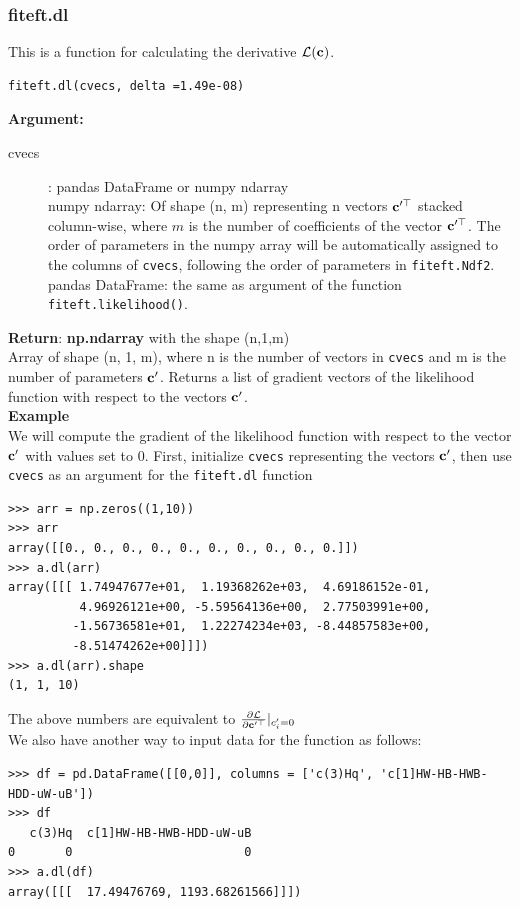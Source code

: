 \documentclass[12pt]{article}
\def\b#1{\boldsymbol{\rm #1}}
\begin{document}
\subsubsection{fiteft.dl}
This is a function for calculating the derivative $\mathcal{L}(\b c)$.
\begin{verbatim}
fiteft.dl(cvecs, delta =1.49e-08)
\end{verbatim}
\textbf{Argument:}
\begin{description}
  \item[cvecs]: pandas DataFrame or numpy ndarray\\
  numpy ndarray: Of shape (n, m) representing n vectors $\b c'^\top$ stacked column-wise, where $m$ is the number of coefficients of the vector $\b c'^\top$. The order of parameters in the numpy array will be automatically assigned to the columns of \verb|cvecs|, following the order of parameters in  \verb|fiteft.Ndf2|.\\
  pandas DataFrame: the same as argument of the function \verb|fiteft.likelihood()|.
 \end{description}
 \textbf{Return}: \textbf{np.ndarray} with the shape (n,1,m)\\
 \indent Array of shape (n, 1, m), where n is the number of vectors in \verb|cvecs| and m is the number of parameters $\b c'$. Returns a list of gradient vectors of the likelihood function with respect to the vectors $\b c'$.
 \\[1cm]
 \textbf{Example}\\
 We will compute the gradient of the likelihood function with respect to the vector $\b c'$ with values set to 0. First, initialize \verb|cvecs| representing the vectors $\b c'$, then use \verb|cvecs| as an argument for the \verb|fiteft.dl| function
\begin{verbatim}
>>> arr = np.zeros((1,10))
>>> arr
array([[0., 0., 0., 0., 0., 0., 0., 0., 0., 0.]])
>>> a.dl(arr)
array([[[ 1.74947677e+01,  1.19368262e+03,  4.69186152e-01,
          4.96926121e+00, -5.59564136e+00,  2.77503991e+00,
         -1.56736581e+01,  1.22274234e+03, -8.44857583e+00,
         -8.51474262e+00]]])
>>> a.dl(arr).shape
(1, 1, 10)
\end{verbatim}
The above numbers are equivalent to $\frac{\partial \mathcal{L}}{\partial \b c'^\top}|_{c'_i=0} $\\
We also have another way to input data for the function as follows:
\begin{verbatim}
>>> df = pd.DataFrame([[0,0]], columns = ['c(3)Hq', 'c[1]HW-HB-HWB-HDD-uW-uB'])
>>> df
   c(3)Hq  c[1]HW-HB-HWB-HDD-uW-uB
0       0                        0
>>> a.dl(df)
array([[[  17.49476769, 1193.68261566]]])
\end{verbatim}
\end{document}
